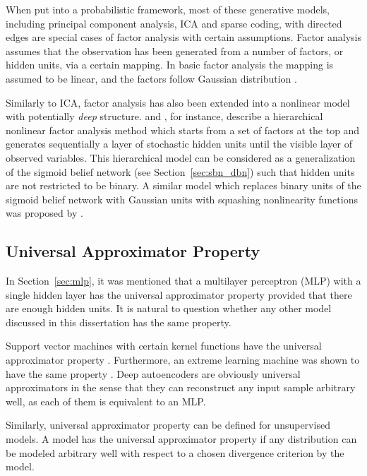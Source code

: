 \documentclass{now}
\begin{document}
When put into a probabilistic framework, most of these
generative models, including principal component analysis,
ICA and sparse coding, with directed edges are special cases
of factor analysis with certain assumptions. Factor analysis
assumes that the observation has been generated from a
number of factors, or hidden units, via a certain mapping.
In basic factor analysis the mapping is
assumed to be linear, and the factors follow Gaussian
distribution \citep[see, e.g.,][Chapter 12.2.4]{Bishop2006}. 

Similarly to ICA, factor analysis has also been extended
into a nonlinear model with potentially \textit{deep}
structure. \citet{Raiko2001} and \citet{Raiko2007}, for instance,
describe a hierarchical nonlinear factor analysis method which
starts from a set of factors at the top and generates
sequentially a layer of stochastic hidden units until the
visible layer of observed variables. This hierarchical model
can be considered as a generalization of the sigmoid belief
network (see Section~\ref{sec:sbn_dbn}) such that hidden
units are not restricted to be binary. A similar model which
replaces binary units of the sigmoid belief network with
Gaussian units with squashing nonlinearity functions 
was proposed by \citet{Frey1999}.

\subsection{Universal Approximator Property}
\label{sec:uap}

In Section~\ref{sec:mlp}, it was mentioned that a
multilayer perceptron (MLP) with a single hidden layer has
the universal approximator property provided that there are
enough hidden units. %
It is natural to question whether any other model
discussed in this dissertation has the same property. 

Support vector machines with certain kernel functions have
the universal approximator property \citep{Hammer2003}.
Furthermore, an extreme learning machine was shown to have
the same property \citep{Huang2006tnn}. Deep autoencoders are
obviously universal approximators in the sense that they can
reconstruct any input sample arbitrary well, as each of them
is equivalent to an MLP.

Similarly, universal approximator property can be defined
for unsupervised models. A model has the universal
approximator property if any distribution can be modeled
arbitrary well with respect to a chosen divergence
criterion by the model.
\end{document}

